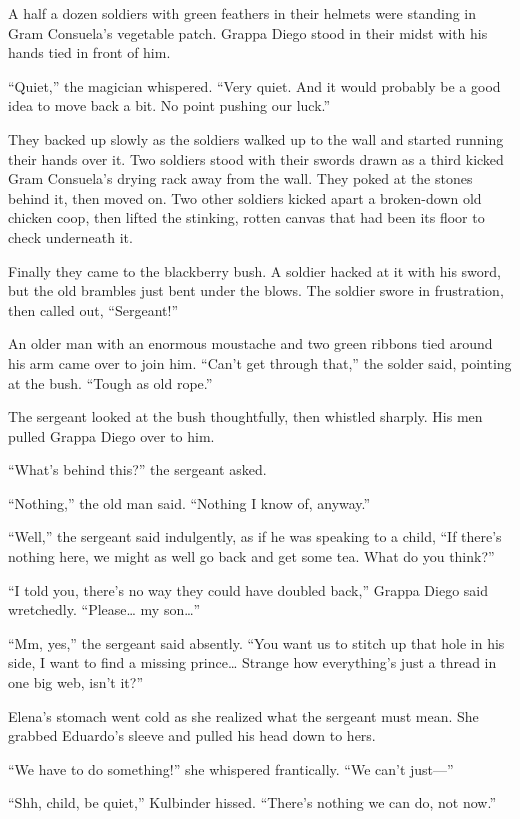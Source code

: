 \documentclass[10pt]{book}
\begin{document}
A half a dozen soldiers with green feathers in their helmets were standing in Gram Consuela's vegetable patch. Grappa Diego stood in their midst with his hands tied in front of him.

``Quiet,'' the magician whispered. ``Very quiet. And it would probably be a good idea to move back a bit. No point pushing our luck.''

They backed up slowly as the soldiers walked up to the wall and started running their hands over it. Two soldiers stood with their swords drawn as a third kicked Gram Consuela's drying rack away from the wall. They poked at the stones behind it, then moved on. Two other soldiers kicked apart a broken-down old chicken coop, then lifted the stinking, rotten canvas that had been its floor to check underneath it.

Finally they came to the blackberry bush. A soldier hacked at it with his sword, but the old brambles just bent under the blows. The soldier swore in frustration, then called out, ``Sergeant!''

An older man with an enormous moustache and two green ribbons tied around his arm came over to join him.  ``Can't get through that,'' the solder said, pointing at the bush. ``Tough as old rope.''

The sergeant looked at the bush thoughtfully, then whistled sharply. His men pulled Grappa Diego over to him.

``What's behind this?'' the sergeant asked.

``Nothing,'' the old man said. ``Nothing I know of, anyway.''

``Well,'' the sergeant said indulgently, as if he was speaking to a child, ``If there's nothing here, we might as well go back and get some tea. What do you think?''

``I told you, there's no way they could have doubled back,'' Grappa Diego said wretchedly. ``Please{\ldots} my son{\ldots}''

``Mm, yes,'' the sergeant said absently. ``You want us to stitch up that hole in his side, I want to find a missing prince{\ldots} Strange how everything's just a thread in one big web, isn't it?''

Elena's stomach went cold as she realized what the sergeant must mean. She grabbed Eduardo's sleeve and pulled his head down to hers.

``We have to do something!'' she whispered frantically. ``We can't just---''

``Shh, child, be quiet,'' Kulbinder hissed. ``There's nothing we can do, not now.''
\end{document}
